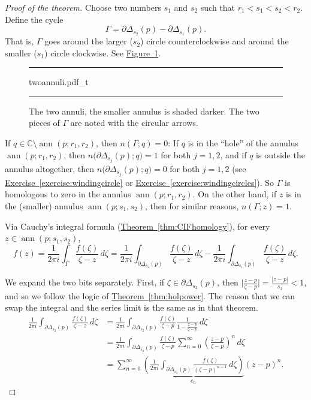 \documentclass[12pt,openany]{book}
\newcommand{\ann}{\operatorname{ann}}
\newcommand{\sabs}[1]{\lvert {#1} \rvert}
\newcommand{\babs}[1]{\bigl\lvert {#1} \bigr\rvert}
\newcommand{\C}{{\mathbb{C}}}
\newcommand{\myquote}[1]{``#1''}
\theoremstyle{plain}
\theoremstyle{remark}
\theoremstyle{definition}
\newenvironment{myfig}{%
\begin{figure}[h!t]
\noindent\rule{\textwidth}{0.5pt}\vspace{12pt}\par\centering}%
{\par\noindent\rule{\textwidth}{0.5pt}
\end{figure}}
\theoremstyle{exercise}
\theoremstyle{example}
\newcommand{\figureref}[1]{\hyperref[#1]{Figure~\ref*{#1}}}
\newcommand{\exerciseref}[1]{\hyperref[#1]{Exercise~\ref*{#1}}}
\newcommand{\thmref}[1]{\hyperref[#1]{Theorem~\ref*{#1}}}
\begin{document}
\begin{proof}[Proof of the theorem]
Choose two numbers $s_1$ and $s_2$ such that $r_1 < s_1 < s_2 < r_2$.
Define the cycle
\begin{equation*}
\Gamma = \partial \Delta_{s_2}(p) - \partial \Delta_{s_1}(p) .
\end{equation*}
That is, $\Gamma$ goes around the larger ($s_2$) circle counterclockwise and
around the smaller ($s_1$) circle clockwise.
See \figureref{fig:twoannuli}.

\begin{myfig}
{twoannuli.pdf_t}
\caption{The two annuli, the smaller annulus is shaded darker.  The two
pieces of $\Gamma$ are noted with the circular arrows.\label{fig:twoannuli}}
\end{myfig}

If $q \in \C \setminus \ann(p;r_1,r_2)$, then $n(\Gamma;q) = 0$:
If $q$ is in the \myquote{hole} of the annulus $\ann(p;r_1,r_2)$, then
$n\bigl(\partial \Delta_{s_j}(p);q\bigr) = 1$ for both $j=1,2$, and 
if $q$ is outside the annulus altogether, then
$n\bigl(\partial \Delta_{s_j}(p);q\bigr) = 0$ for both $j=1,2$ 
(see \exerciseref{exercise:windingcircle} or
\exerciseref{exercise:windingcircles}).
So $\Gamma$ is homologous to zero in the annulus $\ann(p;r_1,r_2)$.
On the other hand, if $z$ is in the (smaller) annulus $\ann(p;s_1,s_2)$,
then for similar reasons, $n(\Gamma;z) = 1$.

Via Cauchy's integral formula (\thmref{thm:CIFhomology}), for every $z \in \ann(p;s_1,s_2)$,
\begin{equation*}
f(z) = 
\frac{1}{2\pi i}
\int_{\Gamma} \frac{f(\zeta)}{\zeta-z} \, d\zeta 
=
\frac{1}{2\pi i}
\int_{\partial \Delta_{s_2}(p)} \frac{f(\zeta)}{\zeta-z} \, d\zeta 
-
\frac{1}{2\pi i}
\int_{\partial \Delta_{s_1}(p)} \frac{f(\zeta)}{\zeta-z} \, d\zeta  .
\end{equation*}

We expand the two bits separately.  First,
if $\zeta \in \partial \Delta_{s_2}(p)$, then
$\babs{\frac{z-p}{\zeta-p}} = \frac{\sabs{z-p}}{s_2} < 1$, and so
we follow the logic of \thmref{thm:holpower}.  The reason that we can
swap the integral and the series limit is the same as in that theorem.
\begin{equation*}
\begin{split}
\frac{1}{2\pi i}
\int_{\partial \Delta_{s_2}(p)} \frac{f(\zeta)}{\zeta-z} \, d\zeta 
& =
\frac{1}{2\pi i}
\int_{\partial \Delta_{s_2}(p)} \frac{f(\zeta)}{\zeta-p}
\frac{1}{1-\frac{z-p}{\zeta-p}} \, d\zeta
\\
& =
\frac{1}{2\pi i}
\int_{\partial \Delta_{s_2}(p)} \frac{f(\zeta)}{\zeta-p}
\sum_{n=0}^\infty
{\left(\frac{z-p}{\zeta-p}\right)}^n \, d\zeta
\\
& =
\sum_{n=0}^\infty
\underbrace{
\left(
\frac{1}{2\pi i}
\int_{\partial \Delta_{s_2}(p)} \frac{f(\zeta)}{{(\zeta-p)}^{n+1}}
 \, d\zeta
\right)
}_{c_n}
{(z-p)}^n .
\end{split}
\end{equation*}


\end{proof}
\end{document}

